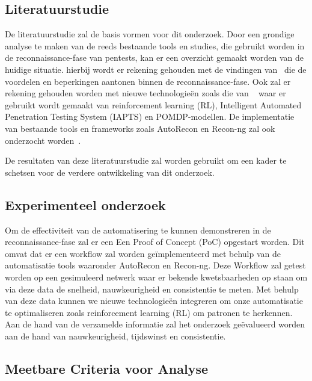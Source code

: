 \subsection{Literatuurstudie}

De literatuurstudie zal de basis vormen voor dit onderzoek. Door een grondige analyse te maken van de reeds bestaande tools en studies,
die gebruikt worden in de reconnaissance-fase van pentests, kan er een overzicht gemaakt worden van de huidige situatie.
hierbij wordt er rekening gehouden met de vindingen van~\textcite{Shah,Kothia} die de voordelen en beperkingen aantonen binnen de reconnaissance-fase.
Ook zal er rekening gehouden worden met nieuwe technologieën zoals die van ~\textcite{Ghanem,Hoang} waar er gebruikt wordt gemaakt van
reinforcement learning (RL), Intelligent Automated Penetration Testing System (IAPTS) en POMDP-modellen. De implementatie van bestaande
tools en frameworks zoals AutoRecon en Recon-ng zal ook onderzocht worden~\autocite{Shebli}.

De resultaten van deze literatuurstudie zal worden gebruikt om een kader te schetsen voor de verdere ontwikkeling van dit onderzoek.

\subsection{Experimenteel onderzoek}

Om de effectiviteit van de automatisering te kunnen demonstreren in de reconnaissance-fase zal er een Een Proof of Concept (PoC) opgestart worden.
Dit omvat dat er een workflow zal worden geïmplementeerd met behulp van de automatisatie tools waaronder AutoRecon en Recon-ng. Deze
Workflow zal getest worden op een gesimuleerd netwerk waar er bekende kwetsbaarheden op staan om via deze data de snelheid,
nauwkeurigheid en consistentie te meten. Met behulp van deze data kunnen we nieuwe technologieën integreren om onze automatisatie te optimaliseren
zoals reinforcement learning (RL) om patronen te herkennen.
Aan de hand van de verzamelde informatie zal het onderzoek geëvalueerd worden aan de hand van nauwkeurigheid, tijdswinst en consistentie.


\subsection{Meetbare Criteria voor Analyse}

